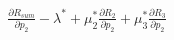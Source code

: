 \documentclass[preview]{standalone}
\begin{document}
\begin{align*}
\frac{\partial {R_{sum}}}{\partial {p_2}} - \lambda^\ast + \mu_2^\ast \frac{\partial {R_2}}{\partial {p_2}} + \mu_3^\ast \frac{\partial {R_3}}{\partial {p_2}}
\end{align*}
\end{document}
